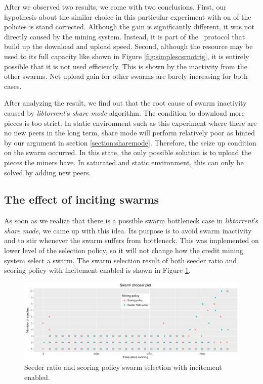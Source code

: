 After we observed two results, we come with two conclusions. First, our hypothesis about the similar choice in this particular experiment with on of the policies is stand corrected. Although the gain is significantly different, it was not directly caused by the mining system. Instead, it is part of the \bt~protocol that build up the download and upload speed. Second, although the resource may be used to its full capacity like shown in Figure \ref{fig:simplescsrnotrig}, it is entirely possible that it is not used efficiently. This is shown by the inactivity from the other swarms. Net upload gain for other swarms are barely increasing for both cases. 

After analyzing the result, we find out that the root cause of swarm inactivity caused by \textit{libtorrent}'s \textit{share mode} algorithm. The condition to download more pieces is too strict. In static environment such as this experiment where there are no new peers in the long term, share mode will perform relatively poor as hinted by our argument in section \ref{section:sharemode}. Therefore, the seize up condition on the swarm occurred. In this state, the only possible solution is to upload the pieces the miners have. In saturated and static environment, this can only be solved by adding new peers. 

\subsection{The effect of inciting swarms}
As soon as we realize that there is a possible swarm bottleneck case in \textit{libtorrent}'s \textit{share mode}, we came up with this idea. Its purpose is to avoid swarm inactivity and to stir whenever the swarm suffers from bottleneck. This was implemented on lower level of the selection policy, so it will not change how the credit mining system select a swarm. The swarm selection result of both seeder ratio and scoring policy with incitement enabled is shown in Figure \ref{fig:scatterscsrtrig}.

\begin{figure}[h]
	\centering
	\includegraphics[width=\textwidth]{pics/results/scsr_trig_scatter.pdf}
	\caption{Seeder ratio and scoring policy swarm selection with incitement enabled.}
	\label{fig:scatterscsrtrig}
\end{figure}

